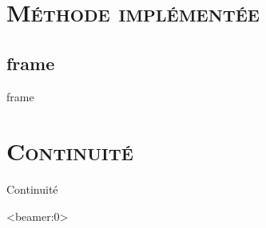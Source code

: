 \documentclass[xcolor=x11names,compress]{beamer}
\renewcommand{\(}{\begin{columns}} \renewcommand{\)}{\end{columns}}
\newcommand{\<}[1]{\begin{column}{#1}} \renewcommand{\>}{\end{column}}
\begin{document}
\section{\scshape Méthode implémentée}
\subsection{frame}
\begin{frame}{frame}

\end{frame}

\section{\scshape Continuité}
\begin{frame}{Continuité}

\end{frame}


\appendix

\begin{frame}<beamer:0>


\end{frame}
\end{document}
